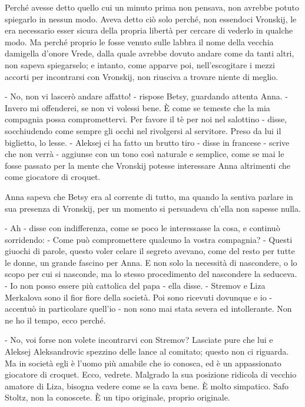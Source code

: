 Perché avesse detto quello cui un minuto prima non pensava, non avrebbe potuto spiegarlo in nessun modo. Aveva detto ciò solo perché, non essendoci Vronskij, le era necessario esser sicura della propria libertà per cercare di vederlo in qualche modo. Ma perché proprio le fosse venuto sulle labbra il nome della vecchia damigella d'onore Vrede, dalla quale avrebbe dovuto andare come da tanti altri, non sapeva spiegarselo; e intanto, come apparve poi, nell'escogitare i mezzi accorti per incontrarsi con Vronskij, non riusciva a trovare niente di meglio. 

- No, non vi lascerò andare affatto! - rispose Betsy, guardando attenta Anna. - Invero mi offenderei, se non vi volessi bene. È come se temeste che la mia compagnia possa compromettervi. Per favore il tè per noi nel salottino - disse, socchiudendo come sempre gli occhi nel rivolgersi al servitore. Preso da lui il biglietto, lo lesse. - Aleksej ci ha fatto un brutto tiro - disse in francese - scrive che non verrà - aggiunse con un tono così naturale e semplice, come se mai le fosse passato per la mente che Vronskij potesse interessare Anna altrimenti che come giocatore di croquet. 

Anna sapeva che Betsy era al corrente di tutto, ma quando la sentiva parlare in sua presenza di Vronskij, per un momento si persuadeva ch'ella non sapesse nulla. 

- Ah - disse con indifferenza, come se poco le interessasse la cosa, e continuò sorridendo: - Come può compromettere qualcuno la vostra compagnia? - Questi giuochi di parole, questo voler celare il segreto avevano, come del resto per tutte le donne, un grande fascino per Anna. E non solo la necessità di nascondere, o lo scopo per cui si nasconde, ma lo stesso procedimento del nascondere la seduceva. - Io non posso essere più cattolica del papa - ella disse. - Stremov e Liza Merkalova sono il fior fiore della società. Poi sono ricevuti dovunque e io - accentuò in particolare quell'io - non sono mai stata severa ed intollerante. Non ne ho il tempo, ecco perché. 

- No, voi forse non volete incontrarvi con Stremov? Lasciate pure che lui e Aleksej Aleksandrovic spezzino delle lance al comitato; questo non ci riguarda. Ma in società egli è l'uomo più amabile che io conosca, ed è un appassionato giocatore di croquet. Ecco, vedrete. Malgrado la sua posizione ridicola di vecchio amatore di Liza, bisogna vedere come se la cava bene. È molto simpatico. Safo Stoltz, non la conoscete. È un tipo originale, proprio originale. 


